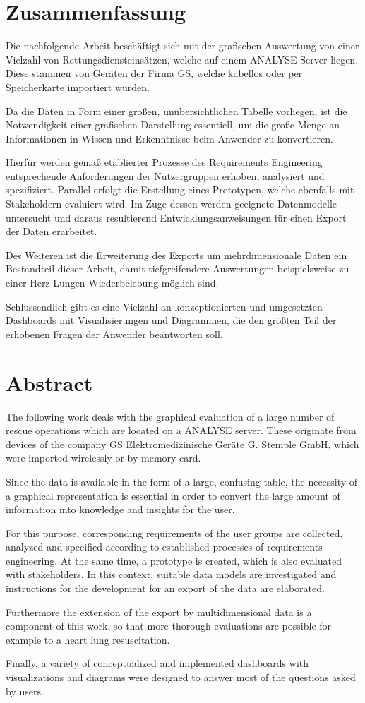 \newpage\thispagestyle{empty}
\section*{Zusammenfassung}

Die nachfolgende Arbeit beschäftigt sich mit der grafischen Auswertung von einer Vielzahl von Rettungsdiensteinsätzen, welche auf einem \acrlong{ANALYSE}-Server liegen.
Diese stammen von Geräten der Firma \acrlong{GS}, welche kabellos oder per Speicherkarte importiert wurden.

Da die Daten in Form einer großen, unübersichtlichen Tabelle vorliegen, ist die Notwendigkeit einer grafischen Darstellung essentiell, um die große Menge an Informationen in Wissen und Erkenntnisse beim Anwender zu konvertieren.

Hierfür werden gemäß etablierter Prozesse des Requirements Engineering entsprechende Anforderungen der Nutzergruppen erhoben, analysiert und spezifiziert.
Parallel erfolgt die Erstellung eines Prototypen, welche ebenfalls mit Stakeholdern evaluiert wird.
Im Zuge dessen werden geeignete Datenmodelle untersucht und daraus resultierend Entwicklungsanweisungen für einen Export der Daten erarbeitet.

Des Weiteren ist die Erweiterung des Exports um mehrdimensionale Daten ein Bestandteil dieser Arbeit, damit tiefgreifendere Auswertungen beispielsweise zu einer Herz-Lungen-Wiederbelebung möglich sind.

Schlussendlich gibt es eine Vielzahl an konzeptionierten und umgesetzten Dashboards mit Visualisierungen und Diagrammen, die den größten Teil der erhobenen Fragen der Anwender beantworten soll.

\section*{Abstract}
The following work deals with the graphical evaluation of a large number of
rescue operations which are located on a \acrlong{ANALYSE} server.
These originate from devices of the company GS Elektromedizinische Geräte G. Stemple GmbH, which were imported wirelessly or by memory card.

Since the data is available in the form of a large, confusing table, the necessity of a graphical representation is essential in order to convert the large amount of information into knowledge and insights for the user.

For this purpose, corresponding requirements of the user groups are collected, analyzed and specified according to established processes of requirements engineering.
At the same time, a prototype is created, which is also evaluated with stakeholders.
In this context, suitable data models are investigated and instructions for the development for an export of the data are elaborated.

Furthermore the extension of the export by multidimensional data is a component of this work, so that more thorough evaluations are possible for example to a heart lung resuscitation.

Finally, a variety of conceptualized and implemented dashboards with visualizations and diagrams were  designed to answer most of the questions asked by users.

\newpage